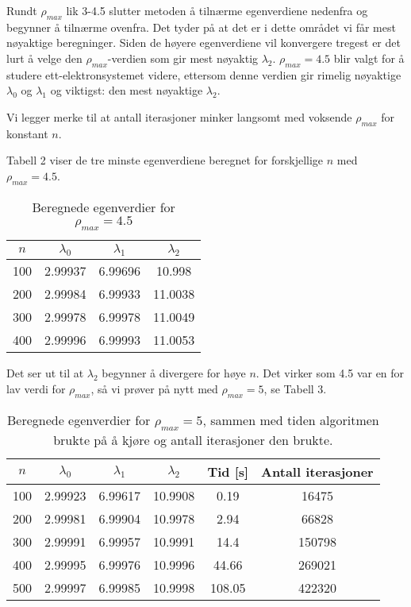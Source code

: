 \documentclass[norsk, 12pt]{article}
\begin{document}
Rundt $\rho_{max}$ lik 3-4.5 slutter metoden å tilnærme egenverdiene
nedenfra og begynner å tilnærme ovenfra. Det tyder på at det er i dette området vi får mest nøyaktige beregninger.
 Siden de høyere egenverdiene vil konvergere
tregest er det lurt å velge den $\rho_{max}$-verdien som gir mest nøyaktig $\lambda_2$.
$\rho_{max} = 4.5$ blir valgt for å studere ett-elektronsystemet videre, ettersom denne verdien gir rimelig nøyaktige 
$\lambda_0$ og $\lambda_1$ og viktigst: den mest nøyaktige $\lambda_2$.

Vi legger merke til at antall iterasjoner minker langsomt med voksende $\rho_{max}$ for konstant $n$.

Tabell 2 viser de tre minste egenverdiene beregnet for forskjellige $n$ med $\rho_{max}=4.5$. 
\begin{table}[h!]
 \centering

\begin{tabular}{|c|c|c|c|}\hline
 $n$ & $\lambda_0$ & $\lambda_1$ & $\lambda_2$\\ \hline
 100 & 2.99937 & 6.99696 & 10.998\\
 200 & 2.99984 & 6.99933 & 11.0038 \\
 300 & 2.99978 & 6.99978 & 11.0049 \\
 400 & 2.99996 & 6.99993 & 11.0053 \\ \hline 
\end{tabular}
\caption{Beregnede egenverdier for $\rho_{max} = 4.5$}
\end{table}

Det ser ut til at $\lambda_2$ begynner å divergere for høye $n$. Det virker som 4.5 var en for lav verdi for $\rho_{max}$, så vi
prøver på nytt med $\rho_{max} = 5$, se Tabell 3.

\begin{table}[h!]
 \centering
 \begin{tabular}{|c|c|c|c|c|c|}\hline
  $n$ & $\lambda_0$ & $\lambda_1$ & $\lambda_2$ & Tid [s] & Antall iterasjoner \\ \hline
  100 & 2.99923 & 6.99617 & 10.9908 & 0.19 & 16475\\
  200 & 2.99981 & 6.99904 & 10.9978 & 2.94 & 66828 \\
  300 & 2.99991 & 6.99957 & 10.9991 & 14.4 & 150798 \\
  400 & 2.99995 & 6.99976 & 10.9996 & 44.66 & 269021 \\
  500 & 2.99997 & 6.99985 & 10.9998 & 108.05 & 422320 \\ \hline 
 \end{tabular}
\caption{Beregnede egenverdier for $\rho_{max} = 5$, sammen med tiden algoritmen brukte på å kjøre og antall iterasjoner
den brukte.}
\end{table}
\end{document}
